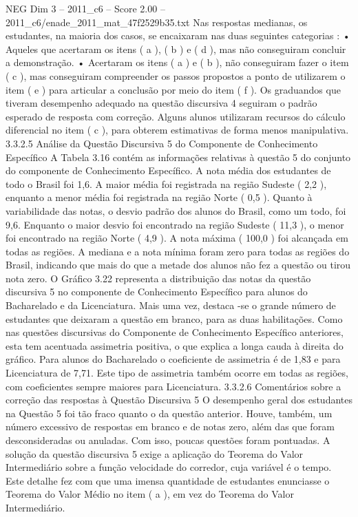 \begin{textsample}{NEG Dim 3 – 2011\_c6 – Score 2.00 – 2011\_c6/enade\_2011\_mat\_47f2529b35.txt}
Nas respostas medianas, os estudantes, na maioria dos casos, se encaixaram nas duas seguintes categorias : • Aqueles que acertaram os itens ( a ), ( b ) e ( d ), mas não conseguiram concluir a demonstração. • Acertaram os itens ( a ) e ( b ), não conseguiram fazer o item ( c ), mas conseguiram compreender os passos propostos a ponto de utilizarem o item ( e ) para articular a conclusão por meio do item ( f ).
Os graduandos que tiveram desempenho adequado na questão discursiva 4 seguiram o padrão esperado de resposta com correção.
Alguns alunos utilizaram recursos do cálculo diferencial no item ( c ), para obterem estimativas de forma menos manipulativa. 3.3.2.5 Análise da Questão Discursiva 5 do Componente de Conhecimento Específico A Tabela 3.16 contém as informações relativas à questão 5 do conjunto do componente de Conhecimento Específico.
A nota média dos estudantes de todo o Brasil foi 1,6.
A maior média foi registrada na região Sudeste ( 2,2 ), enquanto a menor média foi registrada na região Norte ( 0,5 ).
Quanto à variabilidade das notas, o desvio padrão dos alunos do Brasil, como um todo, foi 9,6.
Enquanto o maior desvio foi encontrado na região Sudeste ( 11,3 ), o menor foi encontrado na região Norte ( 4,9 ).
A nota máxima ( 100,0 ) foi alcançada em todas as regiões.
A mediana e a nota mínima foram zero para todas as regiões do Brasil, indicando que mais do que a metade dos alunos não fez a questão ou tirou nota zero.
O Gráfico 3.22 representa a distribuição das notas da questão discursiva 5 no componente de Conhecimento Específico para alunos do Bacharelado e da Licenciatura.
Mais uma vez, destaca -se o grande número de estudantes que deixaram a questão em branco, para as duas habilitações.
Como nas questões discursivas do Componente de Conhecimento Específico anteriores, esta tem acentuada assimetria positiva, o que explica a longa cauda à direita do gráfico.
Para alunos do Bacharelado o coeficiente de assimetria é de 1,83 e para Licenciatura de 7,71.
Este tipo de assimetria também ocorre em todas as regiões, com coeficientes sempre maiores para Licenciatura. 3.3.2.6 Comentários sobre a correção das respostas à Questão Discursiva 5 O desempenho geral dos estudantes na Questão 5 foi tão fraco quanto o da questão anterior.
Houve, também, um número excessivo de respostas em branco e de notas zero, além das que foram desconsideradas ou anuladas.
Com isso, poucas questões foram pontuadas.
A solução da questão discursiva 5 exige a aplicação do Teorema do Valor Intermediário sobre a função velocidade do corredor, cuja variável é o tempo.
Este detalhe fez com que uma imensa quantidade de estudantes enunciasse o Teorema do Valor Médio no item ( a ), em vez do Teorema do Valor Intermediário.

\end{textsample}
